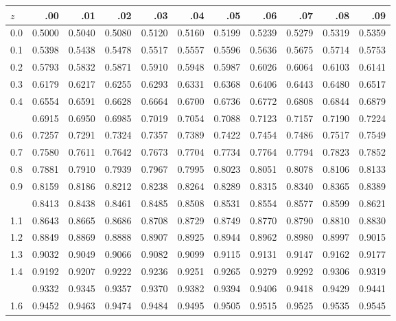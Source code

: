 \documentclass[
]{article}
\begin{document}
\begin{table}[H]
\centering
\begin{tabular}{lrrrrrrrrrr}
\toprule
$z$ & .00 & .01 & .02 & .03 & .04 & .05 & .06 & .07 & .08 & .09\\
\midrule
0.0 & 0.5000 & 0.5040 & 0.5080 & 0.5120 & 0.5160 & 0.5199 & 0.5239 & 0.5279 & 0.5319 & 0.5359\\
0.1 & 0.5398 & 0.5438 & 0.5478 & 0.5517 & 0.5557 & 0.5596 & 0.5636 & 0.5675 & 0.5714 & 0.5753\\
0.2 & 0.5793 & 0.5832 & 0.5871 & 0.5910 & 0.5948 & 0.5987 & 0.6026 & 0.6064 & 0.6103 & 0.6141\\
0.3 & 0.6179 & 0.6217 & 0.6255 & 0.6293 & 0.6331 & 0.6368 & 0.6406 & 0.6443 & 0.6480 & 0.6517\\
0.4 & 0.6554 & 0.6591 & 0.6628 & 0.6664 & 0.6700 & 0.6736 & 0.6772 & 0.6808 & 0.6844 & 0.6879\\
\addlinespace
0.5 & 0.6915 & 0.6950 & 0.6985 & 0.7019 & 0.7054 & 0.7088 & 0.7123 & 0.7157 & 0.7190 & 0.7224\\
0.6 & 0.7257 & 0.7291 & 0.7324 & 0.7357 & 0.7389 & 0.7422 & 0.7454 & 0.7486 & 0.7517 & 0.7549\\
0.7 & 0.7580 & 0.7611 & 0.7642 & 0.7673 & 0.7704 & 0.7734 & 0.7764 & 0.7794 & 0.7823 & 0.7852\\
0.8 & 0.7881 & 0.7910 & 0.7939 & 0.7967 & 0.7995 & 0.8023 & 0.8051 & 0.8078 & 0.8106 & 0.8133\\
0.9 & 0.8159 & 0.8186 & 0.8212 & 0.8238 & 0.8264 & 0.8289 & 0.8315 & 0.8340 & 0.8365 & 0.8389\\
\addlinespace
1.0 & 0.8413 & 0.8438 & 0.8461 & 0.8485 & 0.8508 & 0.8531 & 0.8554 & 0.8577 & 0.8599 & 0.8621\\
1.1 & 0.8643 & 0.8665 & 0.8686 & 0.8708 & 0.8729 & 0.8749 & 0.8770 & 0.8790 & 0.8810 & 0.8830\\
1.2 & 0.8849 & 0.8869 & 0.8888 & 0.8907 & 0.8925 & 0.8944 & 0.8962 & 0.8980 & 0.8997 & 0.9015\\
1.3 & 0.9032 & 0.9049 & 0.9066 & 0.9082 & 0.9099 & 0.9115 & 0.9131 & 0.9147 & 0.9162 & 0.9177\\
1.4 & 0.9192 & 0.9207 & 0.9222 & 0.9236 & 0.9251 & 0.9265 & 0.9279 & 0.9292 & 0.9306 & 0.9319\\
\addlinespace
1.5 & 0.9332 & 0.9345 & 0.9357 & 0.9370 & 0.9382 & 0.9394 & 0.9406 & 0.9418 & 0.9429 & 0.9441\\
1.6 & 0.9452 & 0.9463 & 0.9474 & 0.9484 & 0.9495 & 0.9505 & 0.9515 & 0.9525 & 0.9535 & 0.9545\\

\end{tabular}
\end{table}
\end{document}
